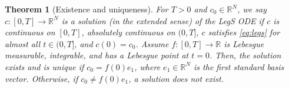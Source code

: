 \documentclass{article}
\newtheorem{theorem}{Theorem}
\theoremstyle{definition}
\begin{document}
\begin{theorem}[Existence and uniqueness] \label{thm:exist and unique}
    For $T>0$ and $c_0 \in \mathbb{R}^N$, we say $c\colon [0,T]\rightarrow \mathbb R^N$ is a solution (in the extended sense) of the LegS ODE if $c$ is
    continuous on $[0,T]$,
    absolutely continuous on $(0,T]$, $c$ satisfies \eqref{eq:legs} for almost all $t \in (0,T]$, and $c(0) = c_0$.
    Assume $f\colon [0,T]\rightarrow \mathbb R$ is Lebesgue measurable, integrable, and 
    has a Lebesgue point at $t=0$. 
    Then, the solution exists and is unique if $c_0 = f(0)e_1$, where $e_1\in \mathbb{R}^N$ is the first standard basis vector.
    Otherwise, if $c_0 \ne  f(0)e_1$, a solution does not exist.
\end{theorem}
\end{document}

